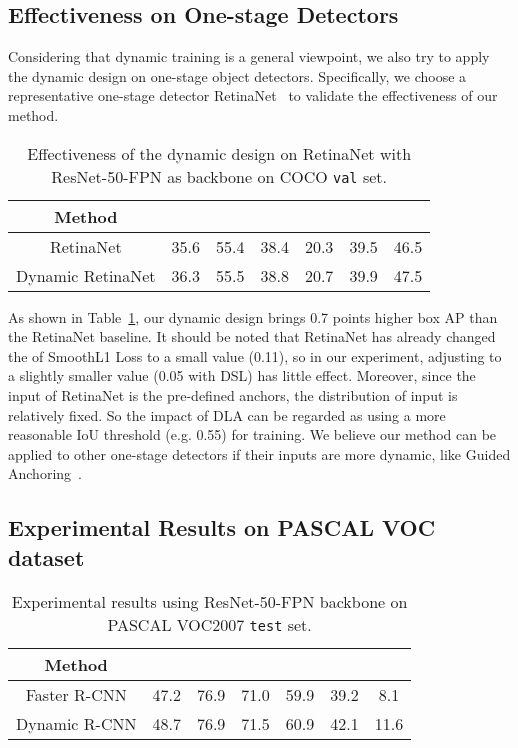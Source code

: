 \documentclass[runningheads]{llncs}
\begin{document}
\subsection{Effectiveness on One-stage Detectors}

Considering that dynamic training is a general viewpoint, we also try to apply the dynamic design on one-stage object detectors. Specifically, we choose a representative one-stage detector RetinaNet~\cite{FocalLoss} to validate the effectiveness of our method. 


\begin{table}[!h]
    \caption{Effectiveness of the dynamic design on RetinaNet with ResNet-50-FPN as backbone on COCO \texttt{val} set.}
    \label{tab:sup_retinanet}
    \begin{center}
\setlength{\tabcolsep}{4pt}
\begin{tabular}{ccccccc}
\toprule
Method &  &  &  &  &  & \\
\midrule
RetinaNet & 35.6 & 55.4 & 38.4 & 20.3 & 39.5 & 46.5\\
Dynamic RetinaNet & 36.3 & 55.5 & 38.8 & 20.7 & 39.9 & 47.5\\
\bottomrule
\end{tabular}
\end{center}
 \end{table}

As shown in Table~\ref{tab:sup_retinanet}, our dynamic design brings 0.7 points higher box AP than the RetinaNet baseline. It should be noted that RetinaNet has already changed the  of SmoothL1 Loss to a small value (0.11), so in our experiment, adjusting  to a slightly smaller value (0.05 with DSL) has little effect. Moreover, since the input of RetinaNet is the pre-defined anchors, the distribution of input is relatively fixed. So the impact of DLA can be regarded as using a more reasonable IoU threshold (e.g. 0.55) for training. We believe our method can be applied to other one-stage detectors if their inputs are more dynamic, like Guided Anchoring~\cite{GuidedAnchor}.


\subsection{Experimental Results on PASCAL VOC dataset}

\begin{table}[!h]
    \caption{Experimental results using ResNet-50-FPN backbone on PASCAL VOC2007 \texttt{test} set.}
    \label{tab:sup_voc}
    \begin{center}
\setlength{\tabcolsep}{4pt}
\begin{tabular}{ccccccc}
\toprule
Method &  &  &  &  &  & \\
\midrule
Faster R-CNN & 47.2 & 76.9 & 71.0 & 59.9 & 39.2 & 8.1\\
Dynamic R-CNN & 48.7 & 76.9 & 71.5 & 60.9 & 42.1 & 11.6\\
\bottomrule
\end{tabular}
\end{center}
 \end{table}
\end{document}
